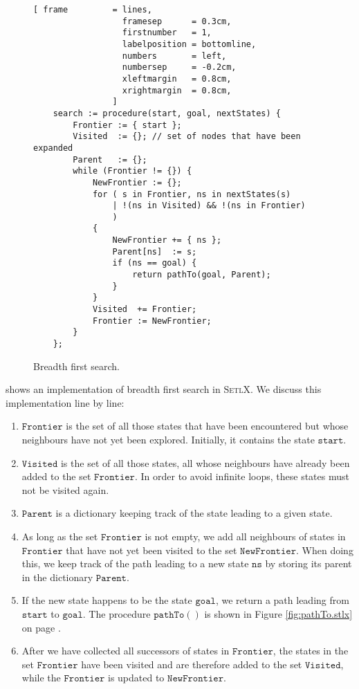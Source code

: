 \begin{figure}[!ht]
\centering
\begin{Verbatim}[ frame         = lines,
                  framesep      = 0.3cm,
                  firstnumber   = 1,
                  labelposition = bottomline,
                  numbers       = left,
                  numbersep     = -0.2cm,
                  xleftmargin   = 0.8cm,
                  xrightmargin  = 0.8cm,
                ]
    search := procedure(start, goal, nextStates) {
        Frontier := { start };
        Visited  := {}; // set of nodes that have been expanded
        Parent   := {};
        while (Frontier != {}) {
            NewFrontier := {};
            for ( s in Frontier, ns in nextStates(s)
                | !(ns in Visited) && !(ns in Frontier)
                )
            {
                NewFrontier += { ns };
                Parent[ns]  := s;
                if (ns == goal) {
                    return pathTo(goal, Parent);
                }
            }
            Visited  += Frontier;
            Frontier := NewFrontier;
        }
    };
\end{Verbatim}
\vspace*{-0.3cm}
\caption{Breadth first search.}
\label{fig:breadth-first-search.stlx}
\end{figure}
 shows an implementation of
breadth first search in \textsc{SetlX}.  We discuss this implementation line by line:
\begin{enumerate}
\item $\mathtt{Frontier}$ is the set of all those states that have been encountered but whose
      neighbours have not yet been explored.  Initially, it contains the state $\mathtt{start}$.
\item $\mathtt{Visited}$ is the set of all those states, all whose neighbours have already been
      added to the set $\mathtt{Frontier}$.  In order to avoid infinite loops, these states must not
      be visited again.
\item $\mathtt{Parent}$ is a dictionary keeping track of the state leading to a given state.
\item As long as the set $\mathtt{Frontier}$ is not empty, we add all neighbours of states in
      $\mathtt{Frontier}$ that have not yet been visited to the set $\mathtt{NewFrontier}$.
      When doing this, we keep track of the path leading to a new state $\mathtt{ns}$ by storing its
      parent in the dictionary $\mathtt{Parent}$.
\item If the new state happens to be the state $\mathtt{goal}$, we return a path leading from
      $\mathtt{start}$ to $\mathtt{goal}$.  The procedure $\mathtt{pathTo}()$ is shown in Figure
      \ref{fig:pathTo.stlx} on page \pageref{fig:pathTo.stlx}.
\item After we have collected all successors of states in $\mathtt{Frontier}$, the states
      in the set $\mathtt{Frontier}$ have been visited and are therefore added to the set
      $\mathtt{Visited}$, while the $\mathtt{Frontier}$ is updated to $\mathtt{NewFrontier}$.
\end{enumerate}

